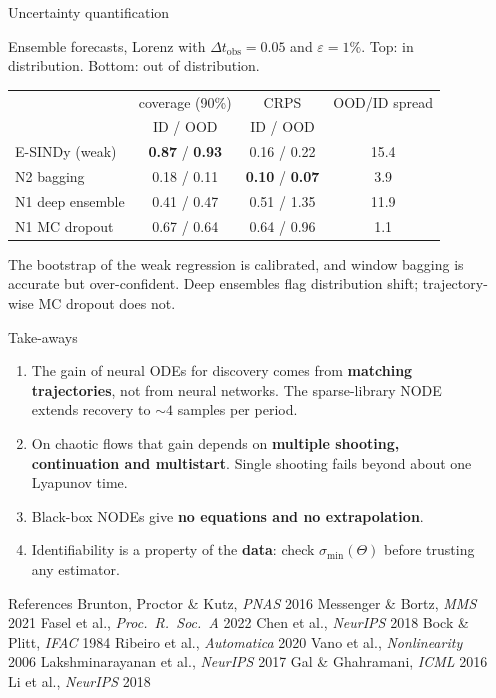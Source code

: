 \documentclass[final]{beamer}
\newlength{\sepwidth}
\newlength{\colwidth}
\newcommand{\separatorcolumn}{\begin{column}{\sepwidth}\end{column}}
\newcommand{\dto}{\Delta t_{\mathrm{obs}}}
\begin{document}
\begin{frame}[t]
\begin{columns}[t]
\begin{column}{\colwidth}
\begin{block}{Uncertainty quantification}
    \raggedright
    Ensemble forecasts, Lorenz with $\dto=0.05$ and $\varepsilon=1\%$. Top: in distribution. Bottom: out of distribution.
\begin{center}\small
\begin{tabular}{lccc}
\toprule
 & coverage (90\%) & CRPS & OOD/ID spread \\
 & ID / OOD & ID / OOD & \\
\midrule
E-SINDy (weak) & \textbf{0.87} / \textbf{0.93} & 0.16 / 0.22 & 15.4 \\
N2 bagging & 0.18 / 0.11 & \textbf{0.10} / \textbf{0.07} & 3.9 \\
N1 deep ensemble & 0.41 / 0.47 & 0.51 / 1.35 & 11.9 \\
N1 MC dropout & 0.67 / 0.64 & 0.64 / 0.96 & 1.1 \\
\bottomrule
\end{tabular}
\end{center}
The bootstrap of the weak regression is calibrated, and window bagging is accurate but over-confident. Deep ensembles flag distribution shift; trajectory-wise MC dropout does not.
  \end{block}

  \begin{alertblock}{Take-aways}
    \begin{enumerate}
  \item The gain of neural ODEs for discovery comes from \textbf{matching trajectories}, not from neural networks. The sparse-library NODE extends recovery to $\sim\!4$ samples per period.
  \item On chaotic flows that gain depends on \textbf{multiple shooting, continuation and multistart}. Single shooting fails beyond about one Lyapunov time.
  \item Black-box NODEs give \textbf{no equations and no extrapolation}.
  \item Identifiability is a property of the \textbf{data}: check $\sigma_{\min}(\Theta)$ before trusting any estimator.
\end{enumerate}
  \end{alertblock}

  \begin{block}{References}
    \footnotesize
    Brunton, Proctor \& Kutz, \emph{PNAS} 2016 \textbullet{}
    Messenger \& Bortz, \emph{MMS} 2021 \textbullet{}
    Fasel et al., \emph{Proc.\ R.\ Soc.\ A} 2022 \textbullet{}
    Chen et al., \emph{NeurIPS} 2018 \textbullet{}
    Bock \& Plitt, \emph{IFAC} 1984 \textbullet{}
    Ribeiro et al., \emph{Automatica} 2020 \textbullet{}
    Vano et al., \emph{Nonlinearity} 2006 \textbullet{}
    Lakshminarayanan et al., \emph{NeurIPS} 2017 \textbullet{}
    Gal \& Ghahramani, \emph{ICML} 2016 \textbullet{}
    Li et al., \emph{NeurIPS} 2018
  \end{block}

\end{column}

\separatorcolumn
\end{columns}
\end{frame}
\end{document}
